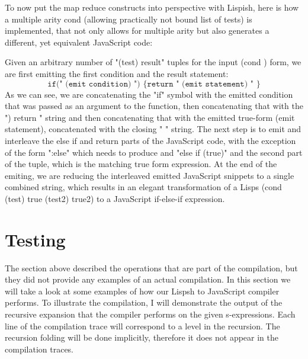 To now put the map reduce constructs into perspective with Lispish, here is how a multiple arity cond (allowing practically not bound list of tests) is implemented, that not only allows for multiple arity but also generates a different, yet equivalent JavaScript code: 



Given an arbitrary number of "(test) result" tuples for the input (cond ) form, we are first emitting the first condition and the result statement: $$ \texttt{if(" (emit condition) ") \{ return " (emit statement) " \}} $$ 
As we can see, we are concatenating the "if" symbol with the emitted condition that was passed as an argument to the function, then concatenating that with the ") { return " string and then concatenating that with the emitted true-form (emit statement), concatenated with the closing " }" string. 
The next step is to emit and interleave the else if and return parts of the JavaScript code, with the exception of the form ":else" which needs to produce and "else if (true)" and the second part of the tuple, which is the matching true form expression.
At the end of the emiting, we are reducing the interleaved emitted JavaScript snippets to a single combined string, which results in an elegant transformation of a Lisps (cond (test) true (test2) true2) to a JavaScript if-else-if expression.

\section{Testing}
The section above described the operations that are part of the compilation, but they did not provide any examples of an actual compilation. 
In this section we will take a look at some examples of how our Lispsh to JavaScript compiler performs. 
To illustrate the compilation, I will demonstrate the output of the recursive expansion that the compiler performs on the given s-expressions. 
Each line of the compilation trace will correspond to a level in the recursion. The recursion folding will be done implicitly, therefore it does not appear in the compilation traces. 

